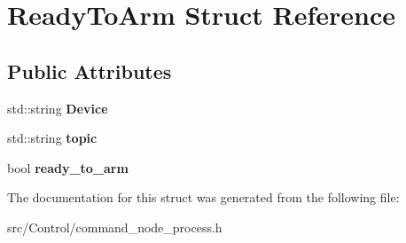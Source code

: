 \hypertarget{structReadyToArm}{}\section{Ready\+To\+Arm Struct Reference}
\label{structReadyToArm}
\subsection*{Public Attributes}
\begin{DoxyCompactItemize}
\item 
\mbox{\label{structReadyToArm_a6124d5454cd3729c40bad0a6f31e78e3}} 
std\+::string {\bfseries Device}
\item 
\mbox{\label{structReadyToArm_af5bce8f8df5638d912c2a7584073b81a}} 
std\+::string {\bfseries topic}
\item 
\mbox{\label{structReadyToArm_a8f047bb7976206952be6f4be17270a20}} 
bool {\bfseries ready\+\_\+to\+\_\+arm}
\end{DoxyCompactItemize}


The documentation for this struct was generated from the following file\+:\begin{DoxyCompactItemize}
\item 
src/\+Control/command\+\_\+node\+\_\+process.\+h\end{DoxyCompactItemize}

